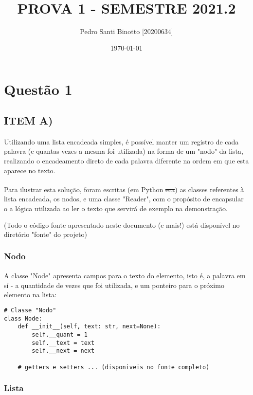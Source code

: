 \documentclass[12pt, letterpaper]{article}
\title{PROVA 1 - SEMESTRE 2021.2}
\author{Pedro Santi Binotto [20200634]}
\date{\today}
\begin{document}
\maketitle

\newpage
\section{Questão 1}
\subsection{ITEM A)}
\paragraph{}
Utilizando uma lista encadeada simples, é possível manter um registro de cada palavra
(e quantas vezes a mesma foi utilizada) na forma de um "nodo" da lista, realizando o
encadeamento direto de cada palavra diferente na ordem em que esta aparece no texto.

\paragraph{}
Para ilustrar esta solução, foram escritas (em Python \st{eca}) as classes referentes à
lista encadeada, os nodos, e uma classe "Reader", com o propósito de encapsular o a
lógica utilizada ao ler o texto que servirá de exemplo na demonstração.

(Todo o código fonte apresentado neste documento (e mais!) está disponível
no diretório "fonte" do projeto)
\subsubsection{Nodo}
\paragraph{}
A classe "Node" apresenta campos para o texto do elemento, isto é, a palavra em sí
- a quantidade de vezes que foi utilizada, e um ponteiro para o próximo elemento na lista:
\begin{lstlisting}
# Classe "Nodo"
class Node:
    def __init__(self, text: str, next=None):
        self.__quant = 1
        self.__text = text
        self.__next = next

    # getters e setters ... (disponiveis no fonte completo)
\end{lstlisting}

\subsubsection{Lista}
\end{document}
